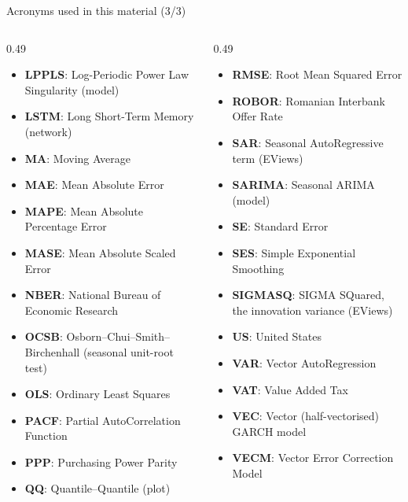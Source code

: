 \begin{frame}{Acronyms used in this material (3/3)}
\begin{columns}[T]
\begin{column}{0.49\textwidth}
\begin{itemize}\setlength{\itemsep}{0pt}
    \item \textbf{LPPLS}: Log-Periodic Power Law Singularity (model)
    \item \textbf{LSTM}: Long Short-Term Memory (network)
    \item \textbf{MA}: Moving Average
    \item \textbf{MAE}: Mean Absolute Error
    \item \textbf{MAPE}: Mean Absolute Percentage Error
    \item \textbf{MASE}: Mean Absolute Scaled Error
    \item \textbf{NBER}: National Bureau of Economic Research
    \item \textbf{OCSB}: Osborn–Chui–Smith–Birchenhall (seasonal unit-root test)
    \item \textbf{OLS}: Ordinary Least Squares
    \item \textbf{PACF}: Partial AutoCorrelation Function
    \item \textbf{PPP}: Purchasing Power Parity
    \item \textbf{QQ}: Quantile–Quantile (plot)
\end{itemize}
\end{column}
\begin{column}{0.49\textwidth}
\begin{itemize}\setlength{\itemsep}{0pt}
    \item \textbf{RMSE}: Root Mean Squared Error
    \item \textbf{ROBOR}: Romanian Interbank Offer Rate
    \item \textbf{SAR}: Seasonal AutoRegressive term (EViews)
    \item \textbf{SARIMA}: Seasonal ARIMA (model)
    \item \textbf{SE}: Standard Error
    \item \textbf{SES}: Simple Exponential Smoothing
    \item \textbf{SIGMASQ}: SIGMA SQuared, the innovation variance (EViews)
    \item \textbf{US}: United States
    \item \textbf{VAR}: Vector AutoRegression
    \item \textbf{VAT}: Value Added Tax
    \item \textbf{VEC}: Vector (half-vectorised) GARCH model
    \item \textbf{VECM}: Vector Error Correction Model
\end{itemize}
\end{column}
\end{columns}
\end{frame}

